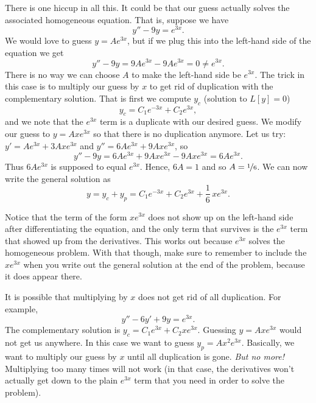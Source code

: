 \documentclass{ximera}
\begin{document}
There is one hiccup in all this.  It could be that our guess actually solves the associated homogeneous equation.  That is, suppose we have
\begin{equation*}
    y'' - 9y = e^{3x} .
\end{equation*}
We would love to guess $y = Ae^{3x}$, but if we plug this into the left-hand side of the equation we get
\begin{equation*}
    y''-9y = 9Ae^{3x} - 9Ae^{3x} = 0 \not= e^{3x} .
\end{equation*}
There is no way we can choose $A$ to make the left-hand side be $e^{3x}$. The trick in this case is to multiply our guess by $x$ to get rid of duplication with the complementary solution.  That is first we compute $y_c$ (solution to $L[y] = 0$)
\begin{equation*}
    y_c = C_1 e^{-3x} + C_2 e^{3x} ,
\end{equation*}
and we note that the $e^{3x}$ term is a duplicate with our desired guess. We modify our guess to $y = Axe^{3x}$ so that there is no duplication anymore.  Let us try: $y' = Ae^{3x} + 3Axe^{3x}$ and  $y'' = 6Ae^{3x} + 9Axe^{3x}$, so
\begin{equation*}
    y'' -9y = 6Ae^{3x} + 9Axe^{3x} - 9Axe^{3x} = 6Ae^{3x} .
\end{equation*}
Thus $6Ae^{3x}$ is supposed to equal $e^{3x}$.  Hence, $6A = 1$ and so $A=\nicefrac{1}{6}$.  We can now write the general solution as
\begin{equation*}
    y = y_c + y_p =  C_1 e^{-3x} + C_2 e^{3x} + \frac{1}{6}\,xe^{3x} .
\end{equation*}

Notice that the term of the form $xe^{3x}$ does not show up on the left-hand side after differentiating the equation, and the only term that survives is the $e^{3x}$ term that showed up from the derivatives. This works out because $e^{3x}$ solves the homogeneous problem. With that though, make sure to remember to include the $xe^{3x}$ when you write out the general solution at the end of the problem, because it does appear there.

It is possible that multiplying by $x$ does not get rid of all duplication.  For example,
\begin{equation*}
    y''-6y'+9y = e^{3x} .
\end{equation*}
The complementary solution is $y_c = C_1 e^{3x} + C_2 x e^{3x}$.  Guessing $y=A xe^{3x}$ would not get us anywhere.  In this case we want to guess $y_p = Ax^2e^{3x}$. Basically, we want to multiply our guess by $x$ until all duplication is gone.  \emph{But no more!}  Multiplying too many times will not work (in that case, the derivatives won't actually get down to the plain $e^{3x}$ term that you need in order to solve the problem).
\end{document}
